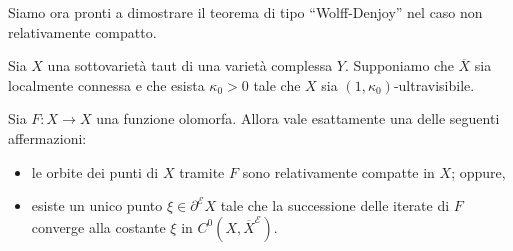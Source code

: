Siamo ora pronti a dimostrare il teorema di tipo ``Wolff-Denjoy'' nel caso non relativamente compatto.

\begin{thm} \label{wd_type_ill}
    Sia $X$ una sottovarietà taut di una varietà complessa $Y$. Supponiamo che $\overline{X}$ sia localmente connessa e che esista $\kappa_0>0$ tale che $X$ sia $(1,\kappa_0)$-ultravisibile.
    
    Sia $F:X \longrightarrow X$ una funzione olomorfa. Allora vale esattamente una delle seguenti affermazioni:
    \begin{itemize}
        \item le orbite dei punti di $X$ tramite $F$ sono relativamente compatte in $X$; oppure,
        \item esiste un unico punto $\xi\in\partial^\mathcal{E}X$ tale che la successione delle iterate di $F$ converge alla costante $\xi$ in $C^0(X,\overline{X}^\mathcal{E})$.
    \end{itemize}
\end{thm}

